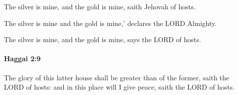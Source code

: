 			\begin{versebox}
					\item[BHS] 
					\item[LXX] 
					\item[ASV] The silver is mine, and the gold is mine, saith Jehovah of hosts.
					\item[NIV] The silver is mine and the gold is mine,’ declares the LORD Almighty.
					\item[NRSV] The silver is mine, and the gold is mine, says the LORD of hosts.
			\end{versebox}

		\paragraph{Haggai 2:9} %
			\label{HAGGAI-2-9}

			The glory of this latter house shall be greater than of the former, saith the LORD of hosts: and in this place will I give peace, saith the LORD of hosts.


